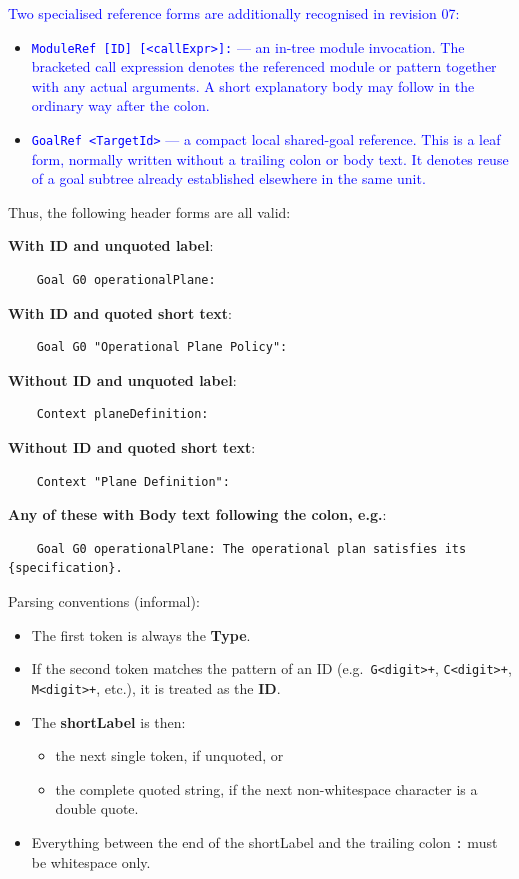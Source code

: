 \documentclass[11pt,twoside,a4paper]{article}
\begin{document}
\textcolor{blue}{Two specialised reference forms are additionally recognised in revision 07:}
\begin{itemize}[leftmargin=2em]
  \item \textcolor{blue}{\texttt{ModuleRef [ID] [<callExpr>]:} --- an in-tree module invocation. The bracketed call expression denotes the referenced module or pattern together with any actual arguments. A short explanatory body may follow in the ordinary way after the colon.}
  \item \textcolor{blue}{\texttt{GoalRef <TargetId>} --- a compact local shared-goal reference. This is a leaf form, normally written without a trailing colon or body text. It denotes reuse of a goal subtree already established elsewhere in the same unit.}
\end{itemize}

Thus, the following header forms are all valid:

\textbf{With ID and unquoted label}:
\begin{verbatim}
    Goal G0 operationalPlane:
\end{verbatim}

\textbf{With ID and quoted short text}:
\begin{verbatim}
    Goal G0 "Operational Plane Policy":
\end{verbatim}

\textbf{Without ID and unquoted label}:
\begin{verbatim}
    Context planeDefinition:
\end{verbatim}

\textbf{Without ID and quoted short text}:
\begin{verbatim}
    Context "Plane Definition":
\end{verbatim}

\textbf{Any of these with Body text following the colon, e.g.}:
\begin{verbatim}
    Goal G0 operationalPlane: The operational plan satisfies its {specification}.
\end{verbatim}
Parsing conventions (informal):

\begin{itemize}[leftmargin=2em]
  \item The first token is always the \textbf{Type}.
  \item If the second token matches the pattern of an ID (e.g.\ \texttt{G<digit>+}, \texttt{C<digit>+}, \texttt{M<digit>+}, etc.), it is treated as the \textbf{ID}.
  \item The \textbf{shortLabel} is then:
  \begin{itemize}[leftmargin=1.5em]
    \item the next single token, if unquoted, or
    \item the complete quoted string, if the next non-whitespace character is a double quote.
  \end{itemize}
  \item Everything between the end of the shortLabel and the trailing colon \texttt{:} must be whitespace only.
\end{itemize}
\end{document}
